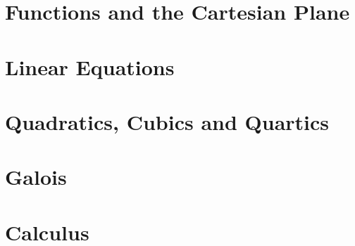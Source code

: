 \documentclass{scrbook}
\begin{document}
\chapter{Functions and the Cartesian Plane}

\chapter{Linear Equations}

\chapter{Quadratics, Cubics and Quartics}

\chapter{Galois}

\chapter{Calculus}
\end{document}
